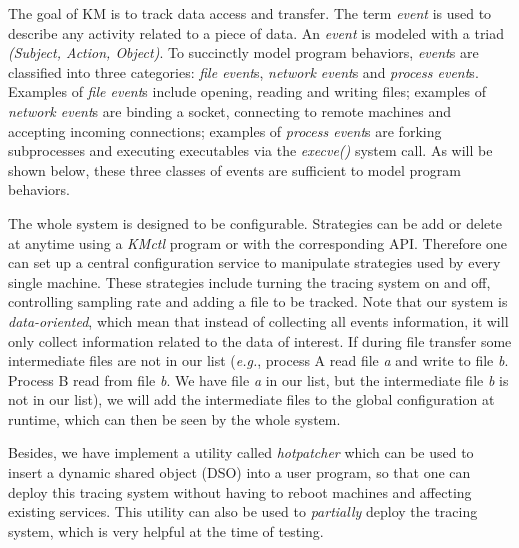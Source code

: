 \documentclass[letterpaper,twocolumn,10pt]{article}
\begin{document}
The goal of KM is to track data access and transfer. The term \textit{event}
is used to describe any activity related to a piece of data. An
\textit{event} is modeled with a triad \textit{(Subject, Action, Object)}. To
succinctly model program behaviors, \textit{event}s are classified into three
categories: \textit{file event}s, \textit{network event}s and \textit{process
event}s. Examples of \textit{file event}s include opening, reading and
writing files; examples of \textit{network event}s are binding a socket,
connecting to remote machines and accepting incoming connections; examples of
\textit{process event}s are forking subprocesses and executing executables
via the \textit{execve()} system call. As will be shown below, these three
classes of events are sufficient to model program behaviors. 

The whole system is designed to be configurable. Strategies can be add or
delete at anytime using a \textit{KMctl} program or with the corresponding
API. Therefore one can set up a central configuration service to manipulate
strategies used by every single machine. These strategies include turning the
tracing system on and off, controlling sampling rate and adding a file to be
tracked. Note that our system is \textit{data-oriented}, which mean that
instead of collecting all events information, it will only collect
information related to the data of interest. If during file transfer some
intermediate files are not in our list (\textit{e.g.}, process A read file
\textit{a} and write to file \textit{b}. Process B read from file \textit{b}.
We have file \textit{a} in our list, but the intermediate file \textit{b} is
not in our list), we will add the intermediate files to the global
configuration at runtime, which can then be seen by the whole system. 

Besides, we have implement a utility called \textit{hotpatcher} which can be
used to insert a dynamic shared object (DSO) into a user program, so that one
can deploy this tracing system without having to reboot machines and
affecting existing services. This utility can also be used to
\textit{partially} deploy the tracing system, which is very helpful at the
time of testing.\\
\end{document}
